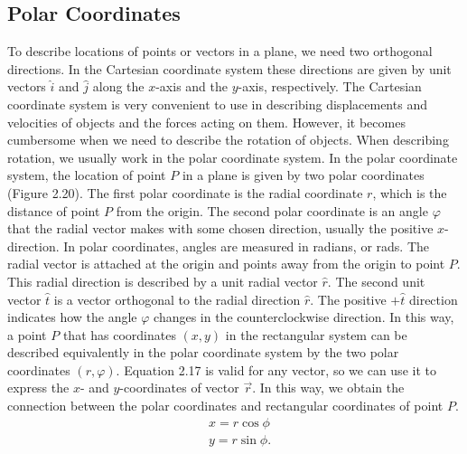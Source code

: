 \documentclass{report}
\begin{document}
        \pagebreak \bigbreak \noindent 


        \bigbreak \noindent 
        \subsection{Polar Coordinates}
        \bigbreak \noindent 
        To describe locations of points or vectors in a plane, we need two orthogonal directions. In the Cartesian coordinate system these directions are given by unit vectors $\hat{i}$ and $\hat{j}$ along the $x$-axis and the $y$-axis, respectively. The Cartesian coordinate system is very convenient to use in describing displacements and velocities of objects and the forces acting on them. However, it becomes cumbersome when we need to describe the rotation of objects. When describing rotation, we usually work in the polar coordinate system.
        \bigbreak \noindent 
        In the polar coordinate system, the location of point $P$ in a plane is given by two polar coordinates (Figure 2.20). The first polar coordinate is the radial coordinate $r$, which is the distance of point $P$ from the origin. The second polar coordinate is an angle $\varphi$ that the radial vector makes with some chosen direction, usually the positive $x$-direction. In polar coordinates, angles are measured in radians, or rads. The radial vector is attached at the origin and points away from the origin to point $P$. This radial direction is described by a unit radial vector $\hat{r}$. The second unit vector $\hat{t}$ is a vector orthogonal to the radial direction $\hat{r}$. The positive $+\hat{t}$ direction indicates how the angle $\varphi$ changes in the counterclockwise direction. In this way, a point $P$ that has coordinates $(x, y)$ in the rectangular system can be described equivalently in the polar coordinate system by the two polar coordinates $(r,\varphi)$. Equation 2.17 is valid for any vector, so we can use it to express the $x$- and $y$-coordinates of vector $\vec{r}$. In this way, we obtain the connection between the polar coordinates and rectangular coordinates of point $P$.
        \begin{align*}
            &x = r\cos{\phi} \\
            &y = r\sin{\phi}
        .\end{align*}
\end{document}
